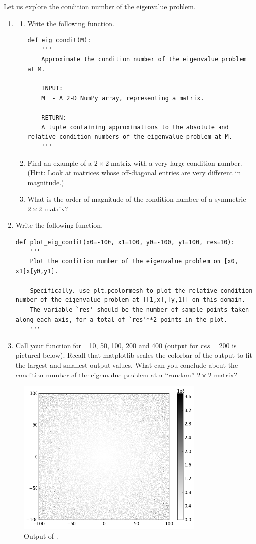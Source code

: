 \begin{problem}[Optional]\label{prob:eigenvalue}
Let us explore the condition number of the eigenvalue problem.
\begin{enumerate}
\item \begin{enumerate}
\item Write the following function.
\begin{lstlisting}
def eig_condit(M):
    '''
    Approximate the condition number of the eigenvalue problem at M.

    INPUT:
    M  - A 2-D NumPy array, representing a matrix.

    RETURN:
    A tuple containing approximations to the absolute and relative condition numbers of the eigenvalue problem at M.
    '''
\end{lstlisting}
\item Find an example of a $2\times2$ matrix with a very large condition number.
(Hint: Look at matrices whose off-diagonal entries are very different in magnitude.)
\item What is the order of magnitude of the condition number of a symmetric $2\times 2$ matrix?
\end{enumerate}
\item Write the following function.
\begin{lstlisting}
def plot_eig_condit(x0=-100, x1=100, y0=-100, y1=100, res=10):
    '''
    Plot the condition number of the eigenvalue problem on [x0, x1]x[y0,y1].

    Specifically, use plt.pcolormesh to plot the relative condition number of the eigenvalue problem at [[1,x],[y,1]] on this domain.
    The variable `res' should be the number of sample points taken along each axis, for a total of `res'**2 points in the plot.
    '''
\end{lstlisting}
\item Call your function for =10, 50, 100, 200 and 400 (output for $res=200$ is pictured below). Recall that matplotlib scales the colorbar of the output to fit the largest and smallest output values.
What can you conclude about the condition number of the eigenvalue problem at a ``random'' $2\times2$ matrix?
\end{enumerate}
\begin{figure}[H]
\includegraphics[height=3in]{eigenvalue_conditioning.png}
\caption{Output of .}
\end{figure}
\end{problem}

